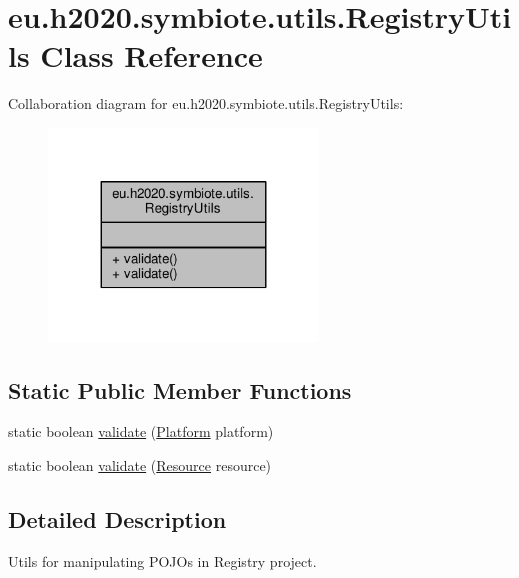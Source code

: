 \hypertarget{classeu_1_1h2020_1_1symbiote_1_1utils_1_1RegistryUtils}{}\section{eu.\+h2020.\+symbiote.\+utils.\+Registry\+Utils Class Reference}
\label{classeu_1_1h2020_1_1symbiote_1_1utils_1_1RegistryUtils}


Collaboration diagram for eu.\+h2020.\+symbiote.\+utils.\+Registry\+Utils\+:
\nopagebreak
\begin{figure}[H]
\begin{center}
\leavevmode
\includegraphics[width=203pt]{classeu_1_1h2020_1_1symbiote_1_1utils_1_1RegistryUtils__coll__graph}
\end{center}
\end{figure}
\subsection*{Static Public Member Functions}
\begin{DoxyCompactItemize}
\item 
static boolean \hyperlink{classeu_1_1h2020_1_1symbiote_1_1utils_1_1RegistryUtils_aa582cda28eb88a92888e378b25323b0a}{validate} (\hyperlink{classeu_1_1h2020_1_1symbiote_1_1model_1_1Platform}{Platform} platform)
\item 
static boolean \hyperlink{classeu_1_1h2020_1_1symbiote_1_1utils_1_1RegistryUtils_a751c1e9ab2152395d5a11c93960ffbf2}{validate} (\hyperlink{classeu_1_1h2020_1_1symbiote_1_1model_1_1Resource}{Resource} resource)
\end{DoxyCompactItemize}


\subsection{Detailed Description}
Utils for manipulating P\+O\+J\+Os in Registry project.

